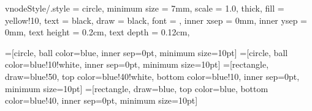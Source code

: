 \tikzset
{
    vnodeStyle/.style =
    {
        circle,                                 %
        minimum size    = 7mm,                %
        scale           = 1.0,                  %
        thick,                                  %
        fill            = yellow!10,             %
        text            = black,                %
        draw            = black,                %
        font            = \scriptsize,              %
        inner xsep      = 0mm,                  %
        inner ysep      = 0mm,                  %
        text height     = 0.2cm,
        text depth      = 0.12cm,
    }
}

=[circle,
  ball color=blue,
  inner sep=0pt,
  minimum size=10pt]
=[circle,
  ball color=blue!10!white,
  inner sep=0pt,
  minimum size=10pt]
=[rectangle, draw=blue!50,
  top color=blue!40!white, bottom color=blue!10,
  inner sep=0pt,
  minimum size=10pt]
=[rectangle, draw=blue,
  top color=blue, bottom color=blue!40,
  inner sep=0pt,
  minimum size=10pt]

%
%
%
%

